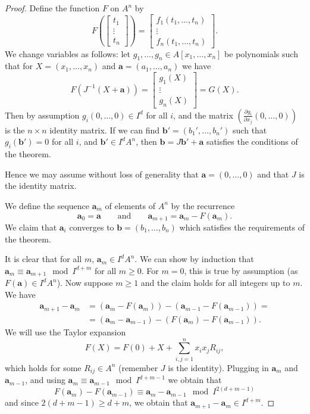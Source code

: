 \documentclass{article}
\theoremstyle{definition}
\theoremstyle{plain}
\theoremstyle{remark}
\begin{document}
	\begin{proof}
		Define the function $F$ on $A^n$ by
		\[F\left(\left[\begin{array}{c}
			t_1\\
			\vdots\\
			t_n
		\end{array}\right]\right) = \left[\begin{array}{c}
			f_1(t_1, \ldots, t_n)\\
			\vdots\\
			f_n(t_1, \ldots, t_n)
		\end{array}\right].\]
		We change variables as follows: let $g_1, \ldots, g_n\in A[x_1, \ldots, x_n]$ be polynomials such that for $X = (x_1, \ldots, x_n)$ and $\mathbf{a} = (a_1, \ldots, a_n)$ we have
		\[F(J^{-1}(X + \mathbf{a})) = \left[\begin{array}{c}
			g_1(X)\\
			\vdots\\
			g_n(X)
		\end{array}\right] = G(X).\]
		Then by assumption $g_i(0, \ldots, 0) \in I^d$ for all $i$, and the matrix $(\frac{\partial g_i}{\partial x_j}(0, \ldots, 0))$ is the $n\times n$ identity matrix. If we can find $\mathbf{b}' = (b_1', \ldots, b_n')$ such that $g_i(\mathbf{b}') = 0$ for all $i$, and $\mathbf{b}'\in I^dA^n$, then $\mathbf{b} = J\mathbf{b}' + \mathbf{a}$ satisfies the conditions of the theorem. 
		
		Hence we may assume without loss of generality that $\mathbf{a} = (0, \ldots, 0)$ and that $J$ is the identity matrix.
		
		We define the sequence $\mathbf{a}_m$ of elements of $A^n$ by the recurrence
		\[\mathbf{a}_0 = \mathbf{a}\qquad\text{and}\qquad \mathbf{a}_{m+1} = \mathbf{a}_m - F(\mathbf{a}_m).\]
		We claim that $\mathbf{a}_i$ converges to $\mathbf{b} = (b_1, \ldots, b_n)$ which satisfies the requirements of the theorem.
		
		It is clear that for all $m$, $\mathbf{a}_m \in I^dA^n$. We can show by induction that $\mathbf{a}_m \equiv \mathbf{a}_{m+1}\mod I^{d+m}$ for all $m\ge 0$. For $m=0$, this is true by assumption (as $F(\mathbf{a})\in I^dA^n$). Now suppose $m\ge 1$ and the claim holds for all integers up to $m$. We have
		\begin{align*}
			\mathbf{a}_{m+1}-\mathbf{a}_m &= (\mathbf{a}_m - F(\mathbf{a}_m)) - (\mathbf{a}_{m-1} - F(\mathbf{a}_{m-1})) =\\
			&= (\mathbf{a}_m - \mathbf{a}_{m-1}) - (F(\mathbf{a}_m) - F(\mathbf{a}_{m-1})).
		\end{align*}	
		We will use the Taylor expansion
		\[F(X) = F(0) + X + \sum_{i,j=1}^n x_ix_jR_{ij},\]
		which holds for some $R_{ij}\in A^n$ (remember $J$ is the identity). Plugging in $\mathbf{a}_m$ and $\mathbf{a}_{m-1}$, and using $\mathbf{a}_{m}\equiv \mathbf{a}_{m-1} \mod I^{d+m-1}$ we obtain that
		\[F(\mathbf{a}_m)-F(\mathbf{a}_{m-1}) \equiv \mathbf{a}_m - \mathbf{a}_{m-1} \mod I^{2(d+m-1)}\]
		and since $2(d+m-1)\ge d + m$, we obtain that $\mathbf{a}_{m+1}-\mathbf{a}_m \in I^{d+m}$.
		

\end{proof}
\end{document}
